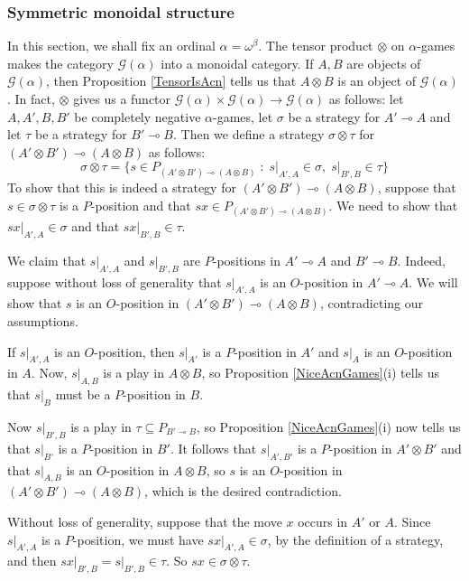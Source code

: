 \documentclass[11pt]{article} %
\theoremstyle{plain} %
\theoremstyle{definition} %
\theoremstyle{note}
\theoremstyle{exercisestyle}
\newcommand{\tensor}{\otimes}
\renewcommand{\implies}{\multimap}
\newcommand{\G}{\mathcal G}
\newcommand{\suchthat}{\;\colon\;}
\renewcommand{\subset}{\subseteq}
\begin{document}
\subsubsection{Symmetric monoidal structure}

In this section, we shall fix an ordinal $\alpha=\omega^\beta$.  The tensor product $\tensor$ on $\alpha$-games makes the category $\G(\alpha)$ into a monoidal category.  If $A,B$ are objects of $\G(\alpha)$, then Proposition \ref{TensorIsAcn} tells us that $A\tensor B$ is an object of $\G(\alpha)$.  In fact, $\tensor$ gives us a functor $\G(\alpha)\times\G(\alpha)\to\G(\alpha)$ as follows: let $A,A',B,B'$ be completely negative $\alpha$-games, let $\sigma$ be a strategy for $A'\implies A$ and let $\tau$ be a strategy for $B'\implies B$.  Then we define a strategy $\sigma\tensor\tau$ for $(A'\tensor B')\implies (A\tensor B)$ as follows:
\[
  \sigma\tensor\tau = \{s\in P_{(A'\tensor B')\implies(A\tensor B)}\suchthat s\vert_{A',A}\in\sigma,\;s\vert_{B',B}\in\tau\}
  \]
To show that this is indeed a strategy for $(A'\tensor B')\implies (A\tensor B)$, suppose that $s\in\sigma\tensor\tau$ is a $P$-position and that $sx\in P_{(A'\tensor B')\implies (A\tensor B)}$.  We need to show that $sx\vert_{A',A}\in\sigma$ and that $sx\vert_{B', B}\in\tau$.  

We claim that $s\vert_{A',A}$ and $s\vert_{B',B}$ are $P$-positions in $A'\implies A$ and $B'\implies B$.  Indeed, suppose without loss of generality that $s\vert_{A',A}$ is an $O$-position in $A'\implies A$.  We will show that $s$ is an $O$-position in $(A'\tensor B')\implies (A\tensor B)$, contradicting our assumptions.

If $s\vert_{A',A}$ is an $O$-position, then $s\vert_{A'}$ is a $P$-position in $A'$ and $s\vert_A$ is an $O$-position in $A$.  Now, $s\vert_{A,B}$ is a play in $A\tensor B$, so Proposition \ref{NiceAcnGames}(i) tells us that $s\vert_B$ must be a $P$-position in $B$.  

Now $s\vert_{B',B}$ is a play in $\tau\subset P_{B'\implies B}$, so Proposition \ref{NiceAcnGames}(i) now tells us that $s\vert_{B'}$ is a $P$-position in $B'$.  It follows that $s\vert_{A',B'}$ is a $P$-position in $A'\tensor B'$ and that $s\vert_{A,B}$ is an $O$-position in $A\tensor B$, so $s$ is an $O$-position in $(A'\tensor B')\implies (A\tensor B)$, which is the desired contradiction.

Without loss of generality, suppose that the move $x$ occurs in $A'$ or $A$.  Since $s\vert_{A', A}$ is a $P$-position, we must have $sx\vert_{A',A}\in\sigma$, by the definition of a strategy, and then $s x\vert_{B',B}=s\vert_{B',B}\in\tau$.  So $sx\in\sigma\tensor\tau$.
\end{document}
